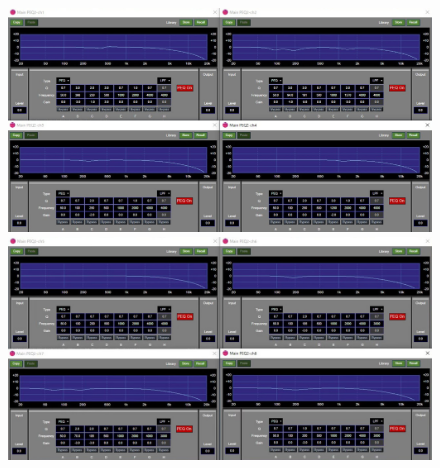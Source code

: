 \documentclass[11pt,a4j]{jreport}
\begin{document}
\begin{figure}[H]
  \begin{minipage}[b]{.5\linewidth}
    \centering
    \includegraphics[width=.9\linewidth]{images/experimentField/afcParameters/04delta/04manualEQ1.jpg}
  \end{minipage}%
  \begin{minipage}[b]{.5\linewidth}
    \centering
    \includegraphics[width=.9\linewidth]{images/experimentField/afcParameters/04delta/04manualEQ2.jpg}
  \end{minipage}


\end{figure}
\end{document}
